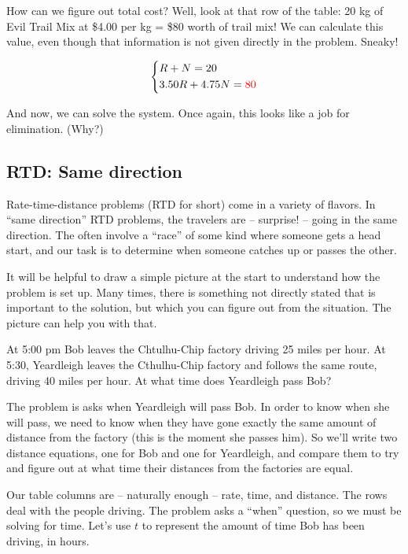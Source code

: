 How can we figure out total cost? Well, look at that row of the table: 20 kg of Evil Trail Mix at \$4.00 per kg = \$80 worth of trail mix! We can calculate this value, even though that information is not given directly in the problem. Sneaky!

\[
\left\{%
\begin{aligned}
&R+N=20\\
&3.50R + 4.75N = {\color{red} 80}
\end{aligned}
\right.
\]

And now, we can solve the system. Once again, this looks like a job for elimination. (Why?)

\subsection*{RTD: Same direction}

Rate-time-distance problems (RTD for short) come in a variety of flavors. In ``same direction'' RTD problems, the travelers are -- surprise! -- going in the same direction. The often involve a ``race'' of some kind where someone gets a head start, and our task is to determine when someone catches up or passes the other.

It will be helpful to draw a simple picture at the start to understand how the problem is set up. Many times, there is something not directly stated that is important to the solution, but which you can figure out from the situation. The picture can help you with that.

\begin{boxex}
At 5:00 pm Bob leaves the Chtulhu-Chip factory driving 25 miles per hour. At 5:30, Yeardleigh leaves the Cthulhu-Chip factory and follows the same route, driving 40 miles per hour. At what time does Yeardleigh pass Bob?
\end{boxex}

The problem is asks when Yeardleigh will pass Bob. In order to know when she will pass, we need to know when they have gone exactly the same amount of distance from the factory (this is the moment she passes him). So we'll write two distance equations, one for Bob and one for Yeardleigh, and compare them to try and figure out at what time their distances from the factories are equal.


Our table columns are -- naturally enough -- rate, time, and distance. The rows deal with the people driving. The problem asks a ``when'' question, so we must be solving for time. Let's use $t$ to represent the amount of time Bob has been driving, in hours.


